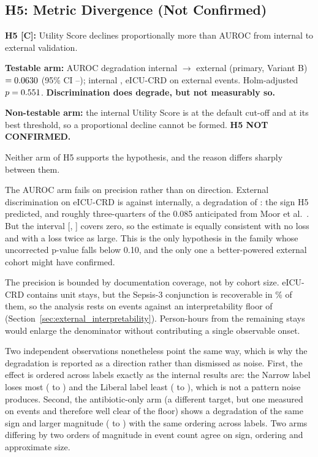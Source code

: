 \subsection{H5: Metric Divergence (Not Confirmed)}
\label{sec:h5}

\begin{mdframed}[backgroundcolor=ATUOrange!20, linecolor=ATUOrange]
    \textbf{H5 [C]:} Utility Score declines proportionally more than AUROC from
    internal to external validation.

    \textbf{Testable arm:} AUROC degradation internal $\to$ external (primary,
    Variant B) $= 0.0630$ (95\% CI \pcHFiveCiLo--\pcHFiveCiHi); internal
    \pcAurocPrimaryB, eICU-CRD \pcExtAurocPrimaryB{} on \pcExtNEventsB{}
    external events. Holm-adjusted $p = 0.551$.
    \textbf{Discrimination does degrade, but not measurably so.}

    \textbf{Non-testable arm:} the internal Utility Score is
    \pcUtilityPrimaryB{} at the default cut-off and \pcUtilityMaxPrimaryB{} at
    its best threshold, so a proportional decline cannot be formed.
    \textbf{H5 NOT CONFIRMED.}
\end{mdframed}

Neither arm of H5 supports the hypothesis, and the reason differs sharply
between them.

The AUROC arm fails on precision rather than on direction. External
discrimination on eICU-CRD is \pcExtAurocPrimaryB{} against \pcAurocPrimaryB{}
internally, a degradation of \pcHFiveEst{}: the sign H5 predicted, and
roughly three-quarters of the 0.085 anticipated from Moor et al.\
\cite{moor2023review}. But the interval [\pcHFiveCiLo, \pcHFiveCiHi] covers
zero, so the estimate is equally consistent with no loss and with a loss twice
as large. This is the only hypothesis in the family whose uncorrected p-value
falls below 0.10, and the only one a better-powered external cohort might have
confirmed.

The precision is bounded by documentation coverage, not by cohort size.
eICU-CRD contains \pcExtNCohortStays{} unit stays, but the Sepsis-3 conjunction
is recoverable in \pcExtMicroCoverage\% of them, so the analysis rests on
\pcExtNEventsB{} events against an interpretability floor of \pcExtMinEvents{}
(Section~\ref{sec:external_interpretability}). Person-hours from the remaining
stays would enlarge the denominator without contributing a single observable
onset.

Two independent observations nonetheless point the same way, which is why the
degradation is reported as a direction rather than dismissed as noise. First,
the effect is ordered across labels exactly as the internal results are: the
Narrow label loses most (\pcAurocPrimaryA{} to \pcExtAurocPrimaryA) and the
Liberal label least (\pcAurocPrimaryC{} to \pcExtAurocPrimaryC), which is not a
pattern noise produces. Second, the antibiotic-only arm (a different target,
but one measured on \pcExtAbxNEventsB{} events and therefore well clear of the
floor) shows a degradation of the same sign and larger magnitude
(\pcAurocPrimaryB{} to \pcExtAbxAurocPrimaryB) with the same ordering across
labels. Two arms differing by two orders of magnitude in event count agree on
sign, ordering and approximate size.

